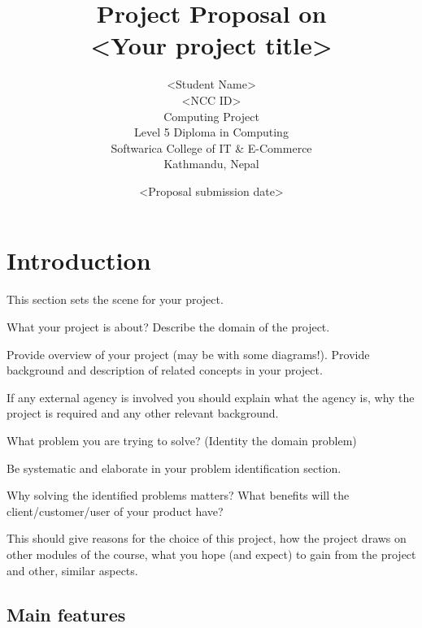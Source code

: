 \documentclass[12pt, a4paper]{report}
\begin{document}
\title{Project Proposal on\\
\bf{\textless Your project title\textgreater}}
\author{\textless Student Name\textgreater\\
\textless NCC ID\textgreater\\
Computing Project \\
Level 5 Diploma in Computing \\
Softwarica College of IT \& E-Commerce \\
Kathmandu, Nepal
}
\date{\textless Proposal submission date\textgreater}

\maketitle
\tableofcontents

\chapter{Introduction} %
\label{cha:introduction}

This section sets the scene for your project.

What your project is about? Describe the domain of the project.

Provide overview of your project (may be with some diagrams!). Provide background and description of related concepts in your project.

If any external agency is involved you should explain what the agency is, why the project is required and any other relevant background.

What problem you are trying to solve? (Identity the domain problem)

Be systematic and elaborate in your problem identification section.

Why solving the identified problems matters? What benefits will the client/customer/user of your product have?

This should give reasons for the choice of this project, how the project draws on other modules of the course, what you hope (and expect) to gain from the project and other, similar aspects.

\section{Main features} %
\label{sec:main_features}
\end{document}
